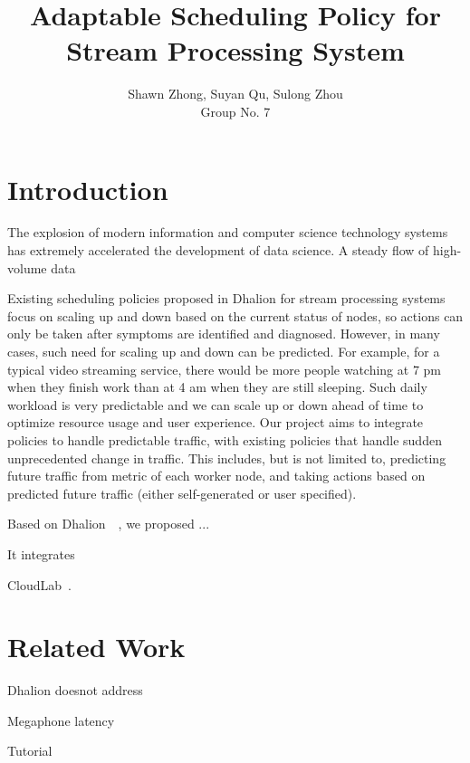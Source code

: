 \documentclass[pdftex,twocolumn,10pt,letterpaper]{article}
\begin{document}
\title{Adaptable Scheduling Policy for Stream Processing System }
\author{
    Shawn Zhong, Suyan Qu, Sulong Zhou \\
    Group No. 7
}
\date{}


\maketitle

\section{Introduction}

The explosion of modern information and computer science technology systems has extremely accelerated the development of data science. A steady flow of high-volume data  

Existing scheduling policies proposed in Dhalion for stream processing systems focus on scaling up and down based on the current status of nodes, so actions can only be taken after symptoms are identified and diagnosed. However, in many cases, such need for scaling up and down can be predicted. For example, for a typical video streaming service, there would be more people watching at 7 pm when they finish work than at 4 am when they are still sleeping. Such daily workload is very predictable and we can scale up or down ahead of time to optimize resource usage and user experience. Our project aims to integrate policies to handle predictable traffic, with existing policies that handle sudden unprecedented change in traffic. This includes, but is not limited to, predicting future traffic from metric of each worker node, and taking actions based on predicted future traffic (either self-generated or user specified). 


Based on Dhalion~\cite{Floratou:2017:DSS:3137765.3137786}~\cite{Agrawal:2018:DAA:3229863.3275594}, we proposed ...

It integrates 


CloudLab~\cite{RicciEide}.
 
\section{Related Work}

Dhalion doesnot address 


Megaphone\cite{Hoffmann:2019:MLS:3329772.3342044} latency

Tutorial
\end{document}
